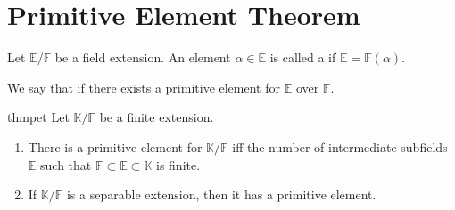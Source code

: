 \section{Primitive Element Theorem}

\begin{defn}%
    Let $\mathbb{E}/\mathbb{F}$ be a field extension. An element $\alpha \in \mathbb{E}$ is called a  if $\mathbb{E} = \mathbb{F}(\alpha).$

    We say that  if there exists a primitive element for $\mathbb{E}$ over $\mathbb{F}.$
\end{defn}

\begin{restatable}{thm}{pet}
\label{thm:pet}
    Let $\mathbb{K}/\mathbb{F}$ be a finite extension. 
    \begin{enumerate}
        \item There is a primitive element for $\mathbb{K}/\mathbb{F}$ iff the number of intermediate subfields $\mathbb{E}$ such that $\mathbb{F} \subset \mathbb{E} \subset \mathbb{K}$ is finite.
        \item If $\mathbb{K}/\mathbb{F}$ is a separable extension, then it has a primitive element. \hfill\hyperref[thm:pet2]{\downsym}
    \end{enumerate}
\end{restatable}
